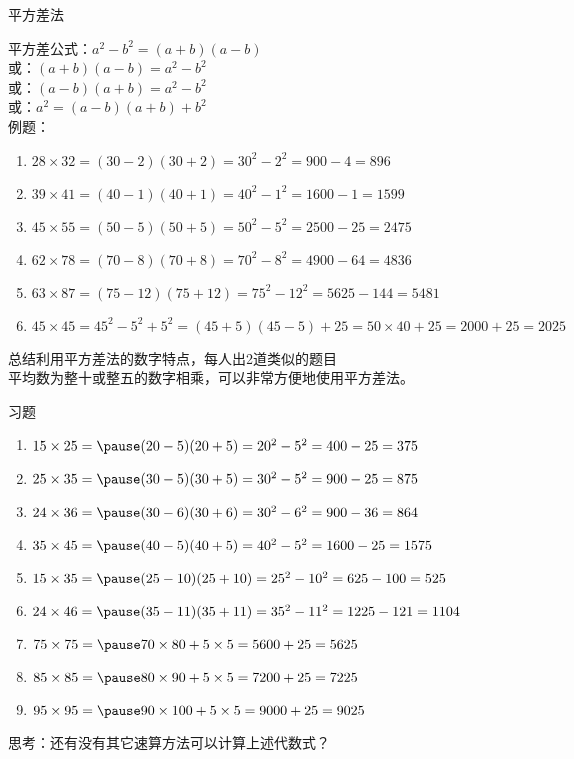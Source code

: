 \documentclass[aspectratio=169]{ctexbeamer} %
\date{\today}
\begin{document}
\begin{frame}[t]{平方差法}
\begin{spacing}{1.2}
\normalsize
平方差公式：$a^2 - b^2 = (a+b)(a-b)$ \\
或：$(a+b)(a-b)=a^2 - b^2$ \\
或：$(a-b)(a+b)=a^2 - b^2$ \\
或：$a^2 = (a-b)(a+b) + b^2$ \\
例题：
\begin{enumerate}[label={\arabic*.}]
\item $28 \times 32 = (30-2)(30+2)=30^2-2^2=900-4=896$
\item $39 \times 41 = (40-1)(40+1)=40^2-1^2=1600-1=1599$
\item $45 \times 55 = (50-5)(50+5)=50^2-5^2=2500-25=2475$
\item $62 \times 78 = (70-8)(70+8)=70^2-8^2=4900-64=4836$
\item $63 \times 87 = (75-12)(75+12)=75^2-12^2=5625-144=5481$
\item $45 \times 45 = 45^2 - 5^2 + 5^2 = (45+5)(45-5) + 25 =50 \times 40 + 25=2000 + 25 = 2025$
\end{enumerate}
\alert{总结利用平方差法的数字特点，每人出2道类似的题目} \\
\pause
平均数为整十或整五的数字相乘，可以非常方便地使用平方差法。
\end{spacing}
\end{frame}

\begin{frame}[t]{习题}
\begin{spacing}{1.2}
\normalsize
\begin{enumerate}[label={\arabic*.}]
\item $15 \times 25 = \pause (20-5)(20+5) = 20^2-5^2 = 400-25 = 375$
\item $25 \times 35 = \pause (30-5)(30+5) = 30^2-5^2 = 900-25 = 875$
\item $24 \times 36 = \pause (30-6)(30+6) = 30^2-6^2 = 900-36 = 864$
\item $35 \times 45 = \pause (40-5)(40+5) = 40^2-5^2 = 1600-25 = 1575$
\item $15 \times 35 = \pause (25-10)(25+10) = 25^2-10^2 = 625-100 = 525$
\item $24 \times 46 = \pause (35-11)(35+11) = 35^2-11^2 = 1225-121 = 1104$
\item $75 \times 75 = \pause 70 \times 80 + 5 \times 5 = 5600 + 25 = 5625$
\item $85 \times 85 = \pause 80 \times 90 + 5 \times 5 = 7200 + 25 = 7225$
\item $95 \times 95 = \pause 90 \times 100 + 5 \times 5 = 9000 + 25 = 9025$
\end{enumerate}
\alert{思考：还有没有其它速算方法可以计算上述代数式？}
\end{spacing}
\end{frame}
\end{document}
